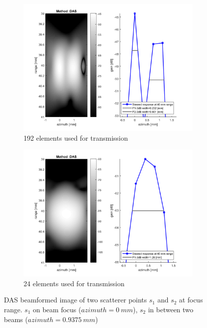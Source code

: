 \begin{figure}[ht]
    \centering
    \begin{subfigure}[t]{0.48\linewidth}
        \includegraphics[width=\linewidth]{./images/discussion/DAS-doublesize.png}
        \caption{192 elements used for transmission}
        \label{fig:length_192}
    \end{subfigure}
    \quad
    \begin{subfigure}[t]{0.48\linewidth}
        \includegraphics[width=\linewidth]{./images/discussion/DAS-fourthsize.png}
        \caption{24 elements used for transmission}
        \label{fig:length_24}
    \end{subfigure}
\caption{DAS beamformed image of two scatterer points $s_1$ and $s_2$ at focus range. $s_1$ on beam focus ($azimuth = 0~mm$), $s_2$ in between two beams ($azimuth = 0.9375~mm$)}
\label{fig:length_array}
\end{figure}

